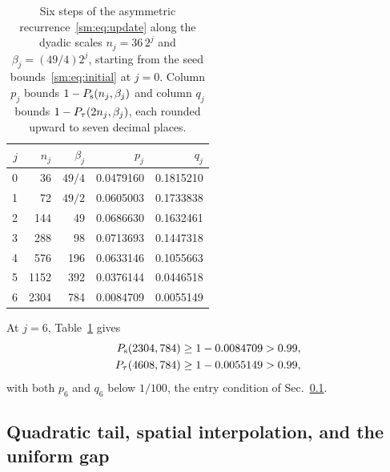 \begin{table}[ht]
    \centering
    \caption{Six steps of the asymmetric recurrence~\eqref{sm:eq:update}
        along the dyadic scales $n_j=36\,2^j$ and $\beta_j=(49/4)2^j$, starting
        from the seed bounds~\eqref{sm:eq:initial} at $j=0$. Column $p_j$
        bounds $1-P_{\mathrm s}(n_j,\beta_j)$ and column $q_j$ bounds
        $1-P_{\tau}(2n_j,\beta_j)$, each rounded upward to seven decimal places.}
    \label{sm:tab:orbit}
    \begin{tabular}{rrrrr}
        \toprule
        $j$ & $n_j$ & $\beta_j$ & $p_j$     & $q_j$     \\
        \midrule
        0   & 36    & $49/4$    & 0.0479160 & 0.1815210 \\
        1   & 72    & $49/2$    & 0.0605003 & 0.1733838 \\
        2   & 144   & 49        & 0.0686630 & 0.1632461 \\
        3   & 288   & 98        & 0.0713693 & 0.1447318 \\
        4   & 576   & 196       & 0.0633146 & 0.1055663 \\
        5   & 1152  & 392       & 0.0376144 & 0.0446518 \\
        6   & 2304  & 784       & 0.0084709 & 0.0055149 \\
        \bottomrule
    \end{tabular}
\end{table}

At $j=6$, Table~\ref{sm:tab:orbit} gives%
~
\begin{align}
    P_{\mathrm s}(2304,784) &\ge1-0.0084709>0.99,\notag\\
    P_{\tau}(4608,784) &\ge1-0.0055149>0.99,
    \label{sm:eq:terminal}
\end{align}
with both $p_6$ and $q_6$ below $1/100$, the entry condition of
Sec.~\ref{sm:sec:gap}.

\subsection{Quadratic tail, spatial interpolation, and the uniform gap}
\label{sm:sec:gap}

